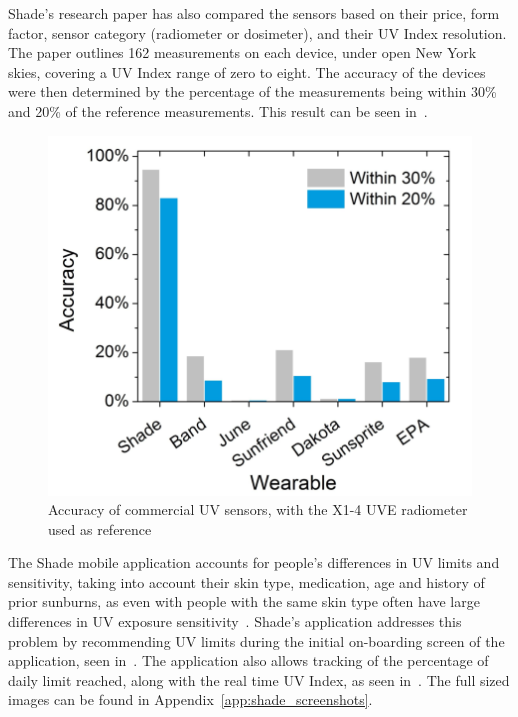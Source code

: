 \documentclass[12pt,openany,a4paper]{book}
\newcommand{\fig}[1]  {Fig.\,\ref{#1}}		%
\newcommand{\app}[1]  {Appendix~\ref{#1}}	%
\begin{document}
Shade's research paper has also compared the sensors based on their price, form
factor, sensor category (radiometer or dosimeter), and their UV Index
resolution. The paper outlines 162 measurements on each device, under open New
York skies, covering a UV Index range of zero to eight. The accuracy of the devices
were then determined by the percentage of the measurements being within 30\% and
20\% of the reference measurements. This result can be seen
in~\cite[\fig{fig:uv_sensors}]{banerjee}.

\begin{figure}[h]
\centerline{\includegraphics[width=.6\textwidth]{UVSensors.png}}
\caption{Accuracy of commercial UV sensors, with the X1-4 UVE radiometer used as
reference}
\label{fig:uv_sensors}
\end{figure}

The Shade mobile application accounts for people's differences in UV limits and
sensitivity, taking into account their skin type, medication, age and history of
prior sunburns, as even with people with the same skin type often have large
differences in UV exposure sensitivity~\cite{wearshade_sensitivity}. Shade's application addresses
this problem by recommending UV limits during the initial on-boarding screen of
the application, seen in~\cite[\fig{fig:shade_onboarding}]{wearshade_sensitivity}. The application also
allows tracking of the percentage of daily limit reached, along with the real
time UV Index, as seen in~\cite[\fig{fig:shade_measurement}]{wearshade_store}. The full sized
images can be found in \app{app:shade_screenshots}.
\end{document}
